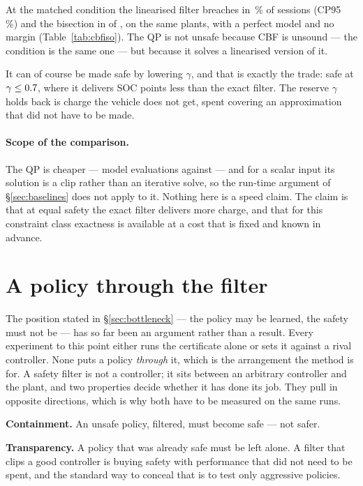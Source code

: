 \documentclass[11pt,letterpaper]{article}
\theoremstyle{definition}
\theoremstyle{remark}
\begin{document}
At the matched condition the linearised filter breaches in \cIsoQpRate\,\% of sessions
(CP95 \cIsoQpCP\,\%) and the bisection in \cIsoZgViol{} of \cIsoTrials, on the same plants, with
a perfect model and no margin (Table~\ref{tab:cbfiso}). The QP is not unsafe because CBF is
unsound --- the condition is the same one --- but because it solves a linearised version of it.

It can of course be made safe by lowering $\gamma$, and that is exactly the trade: safe at
$\gamma \le 0.7$, where it delivers \cIsoGap{} SOC points less than the exact filter.
The reserve $\gamma$ holds back is charge the vehicle does not get, spent covering an
approximation that did not have to be made.

\paragraph{Scope of the comparison.} The QP is cheaper --- \cQpEval{} model evaluations against
\cZgEval --- and for a scalar input its solution is a clip rather than an iterative solve, so the
run-time argument of \S\ref{sec:baselines} does not apply to it. Nothing here is a speed claim.
The claim is that at equal safety the exact filter delivers more charge, and that for this
constraint class exactness is available at a cost that is fixed and known in advance.





\section{A policy through the filter}\label{sec:policy}

The position stated in \S\ref{sec:bottleneck} --- the policy may be learned, the safety must not
be --- has so far been an argument rather than a result. Every experiment to this point either
runs the certificate alone or sets it against a rival controller. None puts a policy
\emph{through} it, which is the arrangement the method is for. A safety filter is not a
controller; it sits between an arbitrary controller and the plant, and two properties decide
whether it has done its job. They pull in opposite directions, which is why both have to be
measured on the same runs.

\textbf{Containment.} An unsafe policy, filtered, must become safe --- not safer.

\textbf{Transparency.} A policy that was already safe must be left alone. A filter that clips a
good controller is buying safety with performance that did not need to be spent, and the
standard way to conceal that is to test only aggressive policies.
\end{document}

